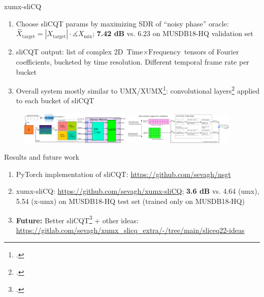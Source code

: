 \documentclass[final]{beamer}
\begin{document}
\begin{frame}{}
\begin{block}{xumx-sliCQ}
\begin{enumerate}
		  \item
			  Choose sliCQT params by maximizing SDR of ``noisy phase'' oracle: $\hat{X}_{\text{target}} = |X_{\text{target}}| \cdot \measuredangle{X_{\text{mix}}}$; \textbf{7.42 dB} vs. 6.23 on MUSDB18-HQ validation set
		  \item
			  sliCQT output: list of complex 2D $\text{Time} \times \text{Frequency}$ tensors of Fourier coefficients, bucketed by time resolution. Different temporal frame rate per bucket
		  \item
			  Overall system mostly similar to UMX/XUMX\footcite{umx, xumx}: convolutional layers\footcite{plumbley2} applied to each bucket of sliCQT
	  \end{enumerate}
    \end{block}
	  \begin{figure}
		  \centering
		  \includegraphics[width=0.47\textwidth]{./images-blockdiagrams/xumx_slicq_system_compressed.png}
		  \hspace{1em}
		  \includegraphics[width=0.47\textwidth]{./images-blockdiagrams/xumx_slicq_pertarget.png}
	  \end{figure}
	\begin{block}{Results and future work}
	  \begin{enumerate}
		  \item
			  PyTorch implementation of sliCQT: \url{https://github.com/sevagh/nsgt}
		  \item
			  xumx-sliCQ: \url{https://github.com/sevagh/xumx-sliCQ}; \textbf{3.6 dB} vs. 4.64 (umx), 5.54 (x-umx) on MUSDB18-HQ test set (trained only on MUSDB18-HQ)
		  \item
			  \textbf{Future:} Better sliCQT\footcite{variableq1} + other ideas: \url{https://gitlab.com/sevagh/xumx_slicq_extra/-/tree/main/sliceq22-ideas}
	  \end{enumerate}
	\end{block}
  \end{frame}
\end{document}
